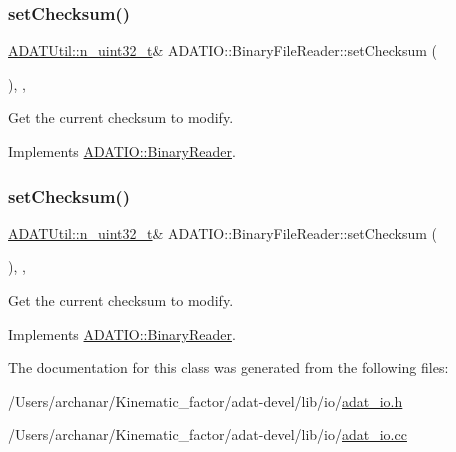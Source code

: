 \subsubsection{\texorpdfstring{setChecksum()}{setChecksum()}\hspace{0.1cm}{\footnotesize\ttfamily [2/3]}}
{\footnotesize\ttfamily \mbox{\hyperlink{namespaceADATUtil_ad945a8afa4db2d1f89b731964adae97e}{A\+D\+A\+T\+Util\+::n\+\_\+uint32\+\_\+t}}\& A\+D\+A\+T\+I\+O\+::\+Binary\+File\+Reader\+::set\+Checksum (\begin{DoxyParamCaption}{ }\end{DoxyParamCaption})\hspace{0.3cm}{\ttfamily [inline]}, {\ttfamily [protected]}, {\ttfamily [virtual]}}



Get the current checksum to modify. 



Implements \mbox{\hyperlink{classADATIO_1_1BinaryReader_a33d291f073bf2e1f71f6bdbe40ce343a}{A\+D\+A\+T\+I\+O\+::\+Binary\+Reader}}.

\mbox{\label{classADATIO_1_1BinaryFileReader_a9279d31577b7fffa174df067c72ebcc4}} 
\subsubsection{\texorpdfstring{setChecksum()}{setChecksum()}\hspace{0.1cm}{\footnotesize\ttfamily [3/3]}}
{\footnotesize\ttfamily \mbox{\hyperlink{namespaceADATUtil_ad945a8afa4db2d1f89b731964adae97e}{A\+D\+A\+T\+Util\+::n\+\_\+uint32\+\_\+t}}\& A\+D\+A\+T\+I\+O\+::\+Binary\+File\+Reader\+::set\+Checksum (\begin{DoxyParamCaption}{ }\end{DoxyParamCaption})\hspace{0.3cm}{\ttfamily [inline]}, {\ttfamily [protected]}, {\ttfamily [virtual]}}



Get the current checksum to modify. 



Implements \mbox{\hyperlink{classADATIO_1_1BinaryReader_a33d291f073bf2e1f71f6bdbe40ce343a}{A\+D\+A\+T\+I\+O\+::\+Binary\+Reader}}.



The documentation for this class was generated from the following files\+:\begin{DoxyCompactItemize}
\item 
/\+Users/archanar/\+Kinematic\+\_\+factor/adat-\/devel/lib/io/\mbox{\hyperlink{adat-devel_2lib_2io_2adat__io_8h}{adat\+\_\+io.\+h}}\item 
/\+Users/archanar/\+Kinematic\+\_\+factor/adat-\/devel/lib/io/\mbox{\hyperlink{adat-devel_2lib_2io_2adat__io_8cc}{adat\+\_\+io.\+cc}}\end{DoxyCompactItemize}
